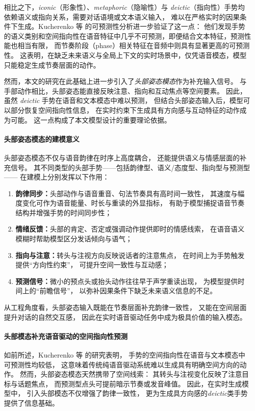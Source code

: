 相比之下，\emph{iconic}（形象性）、\emph{metaphoric}（隐喻性）与 \emph{deictic}（指向性）手势均依赖语义或指向关系，需要对话语境或文本语义输入，
难以在严格实时的因果条件下生成。Kucherenko 等\cite{kucherenko2021predictability} 的可预测性分析进一步验证了这一点：
他们发现手势的语义类别和空间指向性在语音特征中几乎不可预测，即便结合文本特征，预测性能也相当有限，
而节奏阶段（phase）相关特征在音频中则具有显著更高的可预测性。
这表明，在缺乏未来语义与全局上下文的实时场景中，仅凭语音模态，模型只能稳定生成节奏层面的动作。

然而，本文的研究在此基础上进一步引入了\emph{头部姿态模态}作为补充输入信号。
与手部动作相比，头部姿态能直接反映注意、指向和互动焦点等空间要素。
因此，虽然 \emph{deictic} 手势在语音和文本模态中难以预测，
但结合头部姿态输入后，模型可以部分恢复空间指向性信息，
在实时约束下生成具有方向感与互动特征的动作成为可能。
这一点构成了本文模型设计的重要理论依据。

\paragraph{头部姿态模态的建模意义}
头部姿态模态不仅与语音韵律在时序上高度耦合，
还能提供语义与情感层面的补充信号。
其不同类型的头部手势——包括韵律型、语义/态度型、指向型与预测型——
在建模上分别发挥以下作用：
\begin{enumerate}
  \item \textbf{韵律同步：}头部动作与语音重音、句法节奏具有高时间一致性，
        其速度与幅度变化可作为语音能量、时长与重读的外显指标，
        有助于模型捕捉语音节奏结构并增强手势的时间同步性；
  \item \textbf{情绪反馈：}头部的肯定、否定或强调动作提供即时的情感线索，
        在语音语义模糊时帮助模型区分发话倾向与语气；
  \item \textbf{指向与注意：}转头与注视方向反映说话者的注意焦点，
        在时间上为手势触发提供“方向性约束”，
        可提升空间一致性与互动感；
  \item \textbf{预测信号：}微小的预点头或抬头动作往往早于声学重读出现，
        为模型提供时间上的“前瞻信号”，
        以弥补因果条件下缺乏未来语义信息的不足。
\end{enumerate}
从工程角度看，头部姿态输入既能在节奏层面补充韵律一致性，
又能在空间层面提升对话的自然交互感，
因此在实时语音驱动任务中成为极具价值的输入模态。

\paragraph{头部模态补充语音驱动的空间指向性预测}
如前所述，Kucherenko 等\cite{kucherenko2021predictability} 的研究表明，
手势的空间指向性在语音与文本模态中可预测性均较低，
这意味着传统纯语音驱动系统难以生成具有明确空间方向的动作。
然而，头部姿态模态天然携带了空间线索：
其转头与注视变化反映了注意目标与话题焦点，
而预测型点头可提前暗示节奏或发音峰值。
因此，在实时生成模型中，
引入头部模态不仅增强了韵律一致性，
更为生成具方向感的\emph{deictic}类手势提供了信息基础。

